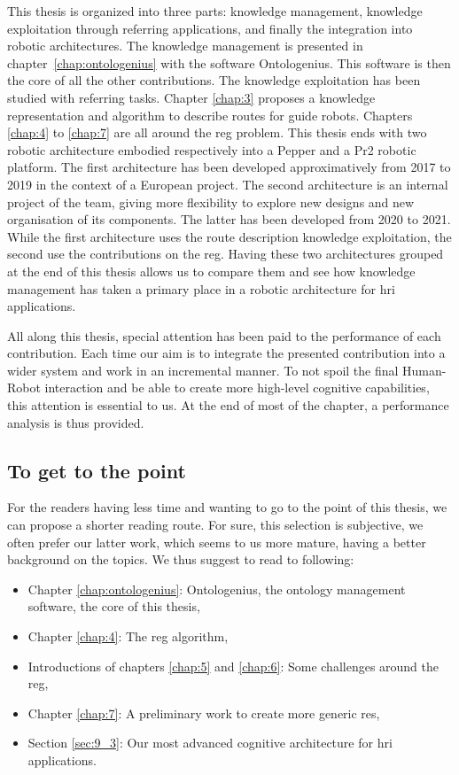 This thesis is organized into three parts: knowledge management, knowledge exploitation through referring applications, and finally the integration into robotic architectures. The knowledge management is presented in chapter~\ref{chap:ontologenius} with the software Ontologenius. This software is then the core of all the other contributions. The knowledge exploitation has been studied with referring tasks. Chapter \ref{chap:3} proposes a knowledge representation and algorithm to describe routes for guide robots. Chapters \ref{chap:4} to \ref{chap:7} are all around the \acrlong{reg} problem. This thesis ends with two robotic architecture embodied respectively into a Pepper and a Pr2 robotic platform. The first architecture has been developed approximatively from 2017 to 2019 in the context of a European project. The second architecture is an internal project of the team, giving more flexibility to explore new designs and new organisation of its components. The latter has been developed from 2020 to 2021. While the first architecture uses the route description knowledge exploitation, the second use the contributions on the \acrlong{reg}. Having these two architectures grouped at the end of this thesis allows us to compare them and see how knowledge management has taken a primary place in a robotic architecture for \acrlong{hri} applications.

All along this thesis, special attention has been paid to the performance of each contribution. Each time our aim is to integrate the presented contribution into a wider system and work in an incremental manner. To not spoil the final Human-Robot interaction and be able to create more high-level cognitive capabilities, this attention is essential to us. At the end of most of the chapter, a performance analysis is thus provided.

\subsection*{To get to the point}

For the readers having less time and wanting to go to the point of this thesis, we can propose a shorter reading route. For sure, this selection is subjective, we often prefer our latter work, which seems to us more mature, having a better background on the topics. We thus suggest to read to following:

\begin{itemize}
  \item Chapter \ref{chap:ontologenius}: Ontologenius, the ontology management software, the core of this thesis,
  \item Chapter \ref{chap:4}: The \acrlong{reg} algorithm,
  \item Introductions of chapters \ref{chap:5} and \ref{chap:6}: Some challenges around the \acrlong{reg},
  \item Chapter \ref{chap:7}: A preliminary work to create more generic \acrlong{re}s,
  \item Section \ref{sec:9_3}: Our most advanced cognitive architecture for \acrlong{hri} applications.
\end{itemize}

